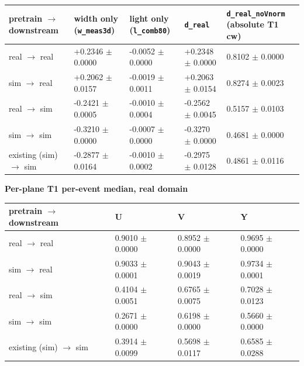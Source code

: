 \documentclass[10pt,a4paper]{article}
\begin{document}
\begin{center}\footnotesize
\setlength{\tabcolsep}{3pt}\renewcommand{\arraystretch}{1.15}
\begin{tabularx}{\linewidth}{LLLLL}
\toprule
\textbf{pretrain $\rightarrow$ downstream} & \textbf{width only (\texttt{w\_\allowbreak{}meas3d})} & \textbf{light only (\texttt{l\_\allowbreak{}comb80})} & \textbf{\texttt{d\_\allowbreak{}real}} & \textbf{\texttt{d\_\allowbreak{}real\_\allowbreak{}noVnorm} (absolute T1 cw)} \\
\midrule
real $\rightarrow$ real & +0.2346 $\pm$ 0.0000 & -0.0052 $\pm$ 0.0000 & +0.2348 $\pm$ 0.0000 & 0.8102 $\pm$ 0.0000 \\
sim $\rightarrow$ real & +0.2062 $\pm$ 0.0157 & -0.0019 $\pm$ 0.0011 & +0.2063 $\pm$ 0.0154 & 0.8274 $\pm$ 0.0023 \\
real $\rightarrow$ sim & -0.2421 $\pm$ 0.0005 & -0.0010 $\pm$ 0.0004 & -0.2562 $\pm$ 0.0045 & 0.5157 $\pm$ 0.0103 \\
sim $\rightarrow$ sim & -0.3210 $\pm$ 0.0000 & -0.0007 $\pm$ 0.0000 & -0.3270 $\pm$ 0.0000 & 0.4681 $\pm$ 0.0000 \\
existing (sim) $\rightarrow$ sim & -0.2877 $\pm$ 0.0164 & -0.0010 $\pm$ 0.0002 & -0.2975 $\pm$ 0.0128 & 0.4861 $\pm$ 0.0116 \\
\bottomrule
\end{tabularx}
\end{center}
\textbf{Per-plane T1 per-event median, real domain}

\begin{center}\small
\setlength{\tabcolsep}{3pt}\renewcommand{\arraystretch}{1.15}
\begin{tabularx}{\linewidth}{LLLL}
\toprule
\textbf{pretrain $\rightarrow$ downstream} & \textbf{U} & \textbf{V} & \textbf{Y} \\
\midrule
real $\rightarrow$ real & 0.9010 $\pm$ 0.0000 & 0.8952 $\pm$ 0.0000 & 0.9695 $\pm$ 0.0000 \\
sim $\rightarrow$ real & 0.9033 $\pm$ 0.0001 & 0.9043 $\pm$ 0.0019 & 0.9734 $\pm$ 0.0001 \\
real $\rightarrow$ sim & 0.4104 $\pm$ 0.0051 & 0.6765 $\pm$ 0.0075 & 0.7028 $\pm$ 0.0123 \\
sim $\rightarrow$ sim & 0.2671 $\pm$ 0.0000 & 0.6198 $\pm$ 0.0000 & 0.5660 $\pm$ 0.0000 \\
existing (sim) $\rightarrow$ sim & 0.3914 $\pm$ 0.0099 & 0.5698 $\pm$ 0.0117 & 0.6585 $\pm$ 0.0288 \\
\bottomrule
\end{tabularx}
\end{center}
\end{document}
